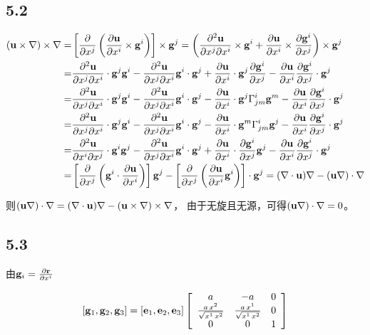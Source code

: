 \documentclass[UTF8,zihao=5]{ctexart}
\newcommand{\bm}[1]{{\mathbf{#1}}}
\newcommand*{\pd}[2]{\frac{\partial #1}{\partial #2}}
\newcommand*{\pdcd}[3]
{\frac{\partial^2 #1}{\partial #2 \partial #3}}
\begin{document}
\subsection*{5.2}


$$
    \begin{aligned}
        (\uu\times\nb)\times\nb
        = &
        \left[\pd{}{x^j}\left(
            \pd{\uu}{x^i}\times\g^i
            \right)\right]\times\g^j
        =
        \left(
        \pdcd{\uu}{x^j}{x^i}\times\g^i
        +\pd{\uu}{x^i}\times\pd{\g^i}{x^j}
        \right)\times\g^j                     \\
        = &
        \pdcd{\uu}{x^j}{x^i}\cdot\g^j\g^i
        -\pdcd{\uu}{x^j}{x^i}\g^i\cdot\g^j
        +\pd{\uu}{x^i}\cdot\g^j\pd{\g^i}{x^j}
        -\pd{\uu}{x^i}\pd{\g^i}{x^j}\cdot\g^j \\
        = &
        \pdcd{\uu}{x^j}{x^i}\cdot\g^j\g^i
        -\pdcd{\uu}{x^j}{x^i}\g^i\cdot\g^j
        -\pd{\uu}{x^i}\cdot\g^j\Gamma^i_{jm}\g^m
        -\pd{\uu}{x^i}\pd{\g^i}{x^j}\cdot\g^j \\
        = &
        \pdcd{\uu}{x^j}{x^i}\cdot\g^j\g^i
        -\pdcd{\uu}{x^j}{x^i}\g^i\cdot\g^j
        -\pd{\uu}{x^i}\cdot\g^m\Gamma^i_{jm}\g^j
        -\pd{\uu}{x^i}\pd{\g^i}{x^j}\cdot\g^j \\
        = &
        \pdcd{\uu}{x^i}{x^j}\cdot\g^i\g^j
        -\pdcd{\uu}{x^j}{x^i}\g^i\cdot\g^j
        +\pd{\uu}{x^i}\cdot\pd{\g^i}{x^j}\g^j
        -\pd{\uu}{x^i}\pd{\g^i}{x^j}\cdot\g^j \\
        = &
        \left[\pd{}{x^j}\left(\g^i\cdot\pd{\uu}{x^i}\right)\right]\g^j
        -
        \left[\pd{}{x^j}\left(\pd{\uu}{x^i}\g^i\right)\right]\cdot\g^j
        =
        (\nb\cdot\uu)\nb - (\uu\nb)\cdot\nb
    \end{aligned}
$$

则$(\uu\nb)\cdot\nb=(\nb\cdot\uu)\nb-(\uu\times\nb)\times\nb$，
由于无旋且无源，可得$(\uu\nb)\cdot\nb=0$。

\subsection*{5.3}

由$\g_i=\pd{\bm{r}}{x^i}$

$$
    [\g_1,\g_2,\g_3]=[\bm{e}_1,\bm{e}_2,\bm{e}_3]
    \left[\begin{array}{ccc} a & -a & 0\\ \frac{a\,x^{2}}{\sqrt{x^{1}\,x^{2}}} & \frac{a\,x^{1}}{\sqrt{x^{1}\,x^{2}}} & 0\\ 0 & 0 & 1 \end{array}\right]
$$
\end{document}
